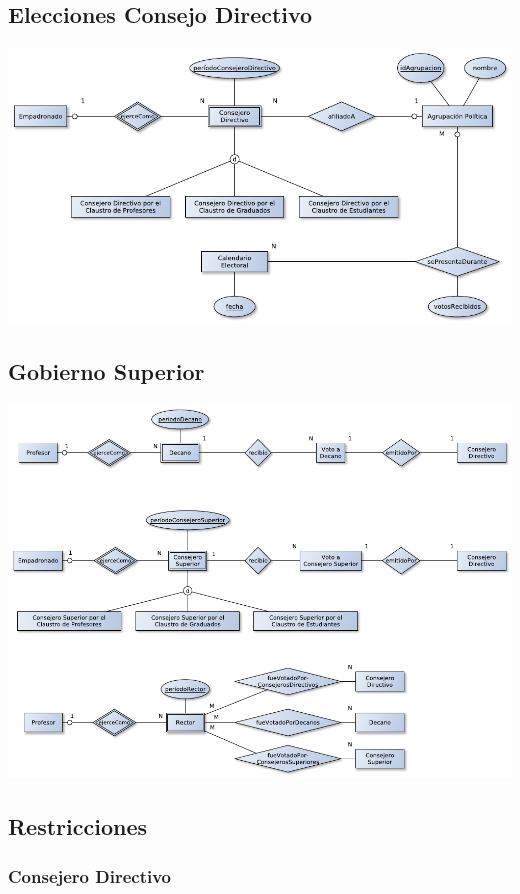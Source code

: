 \documentclass[a4paper, 10pt, twoside]{article}
\begin{document}
\subsection{Elecciones Consejo Directivo}
\includegraphics{../diagramas/eleccionesCD.pdf}

\subsection{Gobierno Superior}
\includegraphics{../diagramas/gobiernoSuperior.pdf}


\subsection{Restricciones}


\subsubsection{Consejero Directivo}
\end{document}
